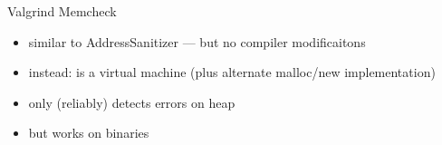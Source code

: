 

\begin{frame}{Valgrind Memcheck}
    \begin{itemize}
    \item similar to AddressSanitizer --- but no compiler modificaitons
    \item instead: is a virtual machine (plus alternate malloc/new implementation)
    \vspace{.5cm}
    \item only (reliably) detects errors on heap
    \item but works on  binaries
    \end{itemize}
\end{frame}

